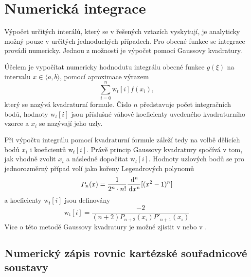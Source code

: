 \section{Numerická integrace}
Výpočet určitých interálů, který se v řešených vztazích vyskytují, je analyticky možný pouze v určitých jednoduchých případech. Pro obecné funkce se integrace provádí numericky. Jednou z možností je výpočet pomocí Gaussovy kvadratury.

Účelem je vypočítat numericky hodnodutu integrálu obecné funkce $g(\xi)$ na intervalu $x\in\langle a, b\rangle$,  pomocí aproximace výrazem
\begin{displaymath}
\sum_{i=0}^{n}\mathrm{w}_{t}[i]f(x_{i}),
\end{displaymath}
který se nazývá kvadraturní formule. Číslo $n$ představuje počet integračních bodů, hodnoty $\mathrm{w}_{t}[i]$ jsou příslušné váhové koeficienty uvedeného kvadraturního vzorce a $x_{i}$ se nazývají jeho uzly. 

Při výpočtu integrálu pomocí kvadraturní formule záleží tedy na volbě dělících bodů $x_{i}$ i koeficientů $\mathrm{w}_{t}[i]$. Právě princip Gaussovy kvadratury spočívá v tom, jak vhodně zvolit $x_{i}$ a následně dopočítat $\mathrm{w}_{t}[i]$. Hodnoty uzlových bodů se pro jednorozměrný případ volí jako kořeny Legendrových polynomů
\begin{displaymath}
	P_{n}(x) = \frac{1}{2^{n}\cdot n!}\frac{\,\mathrm{d}^{n}}{\,\mathrm{d} x^{n}}[(x^{2} - 1)^{n}]
\end{displaymath}
a koeficienty $\mathrm{w}_{t}[i]$ jsou definovány
\begin{displaymath}
\mathrm{w}_{t}[i] = \frac{-2}{(n+2)P_{n+2}(x_i)P'_{n+1}(x_i)}
\end{displaymath}
Více o této metodě Gaussovy kvadratury je možné zjistit v \cite{gk_tichy} nebo v \cite{gk_kaw}.

\subsection{Numerický zápis rovnic kartézské souřadnicové soustavy}
